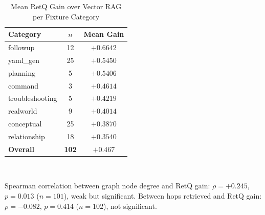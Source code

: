 \begin{table}[t]
\caption{Mean RetQ Gain over Vector RAG per Fixture Category}
\label{tbl:boundary}
\centering
\begin{tabular}{|l|c|c|}
\hline
\textbf{Category} & \textbf{$n$} & \textbf{Mean Gain} \\
\hline
followup & 12 & \textbf{$+0.6642$} \\
\hline
yaml\_gen & 25 & $+0.5450$ \\
\hline
planning & 5 & $+0.5406$ \\
\hline
command & 3 & $+0.4614$ \\
\hline
troubleshooting & 5 & $+0.4219$ \\
\hline
realworld & 9 & $+0.4014$ \\
\hline
conceptual & 25 & $+0.3870$ \\
\hline
relationship & 18 & $+0.3540$ \\
\hline
\textbf{Overall} & \textbf{102} & \textbf{$+0.467$} \\
\hline
\end{tabular}
\\[4pt]
{\footnotesize \raggedright Spearman correlation between graph node degree and RetQ gain: $\rho=+0.245$, $p=0.013$ ($n=101$), weak but significant. Between hops retrieved and RetQ gain: $\rho=-0.082$, $p=0.414$ ($n=102$), not significant.\par}
\end{table}
